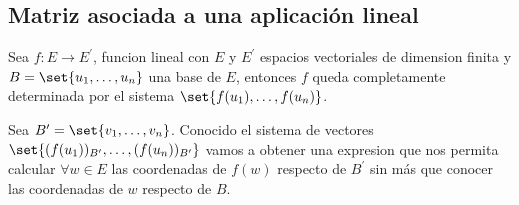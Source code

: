 \subsection{Matriz asociada a una aplicación lineal}
Sea \(f \colon  E \to E^\prime	\), funcion lineal con \(E \) y \( E^\prime\) espacios vectoriales de dimension finita y \(B = \set{u_1, \ldots, u_n }\) una base de \(E \), entonces \(f \) queda completamente determinada por el sistema \(\set{f(u_1), \ldots, f(u_n )}\).  

Sea \(B^\prime = \set{v_1, \ldots, v_n}\). Conocido el sistema de vectores \(\set{(f(u_1))_{B^\prime }, \ldots, (f(u_n))_{B^\prime}}\) vamos a obtener una expresion que nos permita calcular \(\forall w \in E\) las coordenadas de \(f(w )\) respecto de \(B^\prime \) sin más que conocer las coordenadas de \(w \) respecto de \(B \).     

